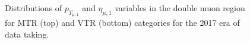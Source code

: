 \begin{figure}[htbp]
{    }
  \caption{Distributions of $p_{T_{\mu,1}}$ and $\eta_{\mu,1}$ variables in the double muon region for MTR (top) and VTR (bottom) categories for the 2017 era of data taking.}
  \label{app:2017_Zmumu_1}
\end{figure}


